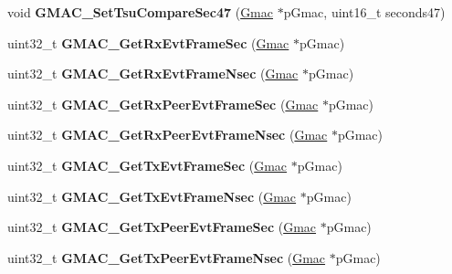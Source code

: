 \begin{DoxyCompactItemize}
\mbox{\label{group__gmac__defines_ga7d1c7e32390f8eefeb3cd260e5ebe9a3}} 
void {\bfseries G\+M\+A\+C\+\_\+\+Set\+Tsu\+Compare\+Sec47} (\mbox{\hyperlink{structGmac}{Gmac}} $\ast$p\+Gmac, uint16\+\_\+t seconds47)
\item 
\mbox{\label{group__gmac__defines_gabbed2434bbaaa579a59059f81fd83c22}} 
uint32\+\_\+t {\bfseries G\+M\+A\+C\+\_\+\+Get\+Rx\+Evt\+Frame\+Sec} (\mbox{\hyperlink{structGmac}{Gmac}} $\ast$p\+Gmac)
\item 
\mbox{\label{group__gmac__defines_ga04acb6946f371f670411fcfc3eed5689}} 
uint32\+\_\+t {\bfseries G\+M\+A\+C\+\_\+\+Get\+Rx\+Evt\+Frame\+Nsec} (\mbox{\hyperlink{structGmac}{Gmac}} $\ast$p\+Gmac)
\item 
\mbox{\label{group__gmac__defines_ga073994dc44c6805e6c4d50c32be80680}} 
uint32\+\_\+t {\bfseries G\+M\+A\+C\+\_\+\+Get\+Rx\+Peer\+Evt\+Frame\+Sec} (\mbox{\hyperlink{structGmac}{Gmac}} $\ast$p\+Gmac)
\item 
\mbox{\label{group__gmac__defines_ga57c14395b5db7213f6847fd5755e2444}} 
uint32\+\_\+t {\bfseries G\+M\+A\+C\+\_\+\+Get\+Rx\+Peer\+Evt\+Frame\+Nsec} (\mbox{\hyperlink{structGmac}{Gmac}} $\ast$p\+Gmac)
\item 
\mbox{\label{group__gmac__defines_ga49e622ab5d904407da962f3270722b95}} 
uint32\+\_\+t {\bfseries G\+M\+A\+C\+\_\+\+Get\+Tx\+Evt\+Frame\+Sec} (\mbox{\hyperlink{structGmac}{Gmac}} $\ast$p\+Gmac)
\item 
\mbox{\label{group__gmac__defines_ga382a180c428aa86860e67422d22b70ff}} 
uint32\+\_\+t {\bfseries G\+M\+A\+C\+\_\+\+Get\+Tx\+Evt\+Frame\+Nsec} (\mbox{\hyperlink{structGmac}{Gmac}} $\ast$p\+Gmac)
\item 
\mbox{\label{group__gmac__defines_ga3318b6baa3969ec8e0bcaec0f316f5d7}} 
uint32\+\_\+t {\bfseries G\+M\+A\+C\+\_\+\+Get\+Tx\+Peer\+Evt\+Frame\+Sec} (\mbox{\hyperlink{structGmac}{Gmac}} $\ast$p\+Gmac)
\item 
\mbox{\label{group__gmac__defines_gac462bc38443ca28a1b9bfea2257ccd11}} 
uint32\+\_\+t {\bfseries G\+M\+A\+C\+\_\+\+Get\+Tx\+Peer\+Evt\+Frame\+Nsec} (\mbox{\hyperlink{structGmac}{Gmac}} $\ast$p\+Gmac)
\end{DoxyCompactItemize}
